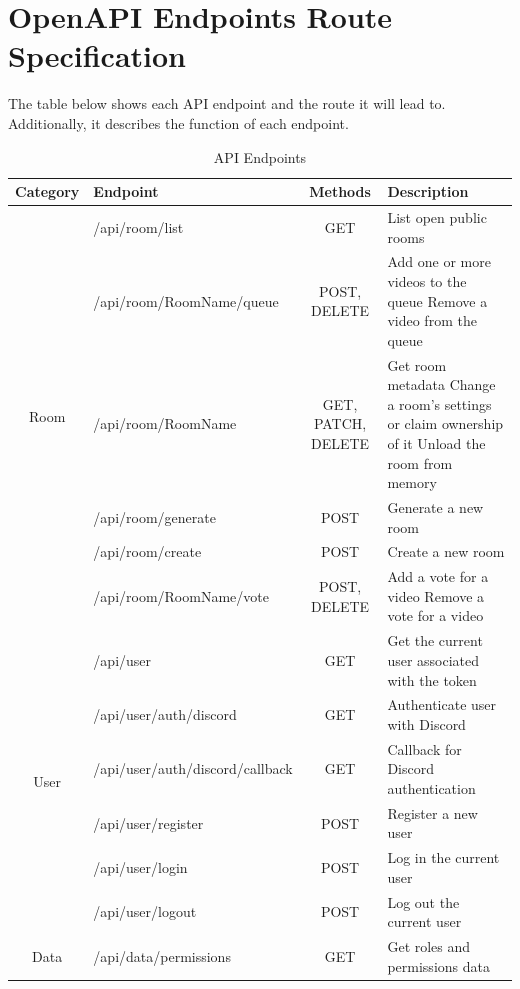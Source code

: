 \section{OpenAPI Endpoints Route Specification}

The table below shows each API endpoint and the route it will lead to. Additionally, it describes the function of each endpoint.


\begin{table}[htbp]
  \centering
  \caption{API Endpoints}
  \begin{tabular}{|c|l|c|p{6.5cm}|}
    \hline
    \textbf{Category} & \textbf{Endpoint} & \textbf{Methods} & \textbf{Description} \\
    \hline
    \multirow{6}{*}{Room} & /api/room/list & GET & List open public rooms \\
    \cline{2-4}
    & /api/room/{RoomName}/queue & POST, DELETE & Add one or more videos to the queue \newline Remove a video from the queue \\
    \cline{2-4}
    & /api/room/{RoomName} & GET, PATCH, DELETE & Get room metadata \newline Change a room's settings or claim ownership of it \newline Unload the room from memory \\
    \cline{2-4}
    & /api/room/generate & POST & Generate a new room \\
    \cline{2-4}
    & /api/room/create & POST & Create a new room \\
    \cline{2-4}
    & /api/room/{RoomName}/vote & POST, DELETE & Add a vote for a video \newline Remove a vote for a video \\
    \hline
    \multirow{6}{*}{User} & /api/user & GET & Get the current user associated with the token \\
    \cline{2-4}
    & /api/user/auth/discord & GET & Authenticate user with Discord \\
    \cline{2-4}
    & /api/user/auth/discord/callback & GET & Callback for Discord authentication \\
    \cline{2-4}
    & /api/user/register & POST & Register a new user \\
    \cline{2-4}
    & /api/user/login & POST & Log in the current user \\
    \cline{2-4}
    & /api/user/logout & POST & Log out the current user \\
    \hline
    \multirow{2}{*}{Data} & /api/data/permissions & GET & Get roles and permissions data \\

\end{tabular}
\end{table}
